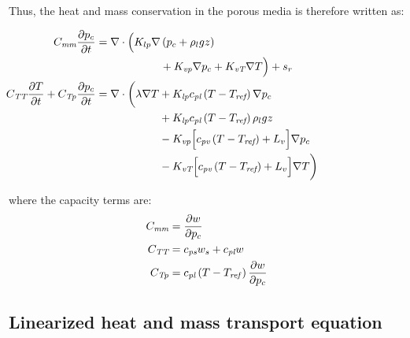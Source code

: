 Thus, the heat and mass conservation in the porous media is therefore written as:

\begin{align}
	&\begin{aligned}
		\mathllap{C_{\textit{mm}}\frac{\partial p_c}{\partial t}} = \nabla \cdot \Big( K_{lp} \nabla &\left(p_c + \rho_l g z\right)\\
				   	 	 & + K_{\textit{vp}}\nabla p_c + K_{\textit{vT}}\nabla T \Big) + s_{r}
	\end{aligned}\\
	&\begin{aligned}
		\mathllap{C_{\textit{TT}}\frac{\partial T}{\partial t} + C_{\textit{Tp}}\frac{\partial p_c}{\partial t}} = \nabla \cdot \bigg(\lambda \nabla T &+  K_{\textit{lp}} c_{\textit{pl}} \left(T - T_{\textit{ref}}\right)  \nabla p_c \\
					&+ K_{\textit{lp}} c_{\textit{pl}} \left(T - T_{\textit{ref}}\right) \rho_l g z\\
					&- K_{\textit{vp}} \Big[c_{\textit{pv}} \left(T - T_{\textit{ref}}\right) + L_v\Big] \nabla p_c \\ 
					&- K_{\textit{vT}} \Big[c_{\textit{pv}} \left(T - T_{\textit{ref}}\right) + L_v\Big] \nabla T \bigg)
	\end{aligned}
\end{align}


where the capacity terms are:
\begin{align}
C_{\textit{mm}} &= \frac{\partial w}{\partial p_c} \\
C_{\textit{TT}} &=  c_{\textit{ps}}w_s + c_{\textit{pl}}w \\
C_{\textit{Tp}} &=  c_{\textit{pl}} \left( T - T_{\mathit{ref}}\right) \frac{\partial w}{\partial p_c}
\end{align}

\subsection{Linearized heat and mass transport equation}

